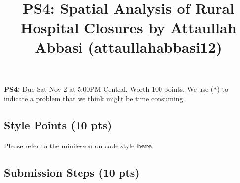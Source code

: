 \documentclass[
  letterpaper,
  DIV=11,
  numbers=noendperiod]{scrartcl}
\title{PS4: Spatial Analysis of Rural Hospital Closures by Attaullah
Abbasi (attaullahabbasi12)}
\author{}
\date{}
\begin{document}
\maketitle



\textbf{PS4:} Due Sat Nov 2 at 5:00PM Central. Worth 100 points. We use
(\texttt{*}) to indicate a problem that we think might be time
consuming.

\subsection{Style Points (10 pts)}\label{style-points-10-pts}

Please refer to the minilesson on code style
\textbf{\href{https://uchicago.zoom.us/rec/share/pG_wQ-pHTQrJTmqNn4rcrw5V194M2H2s-2jdy8oVhWHkd_yZt9o162IWurpA-fxU.BIQlSgZLRYctvzp-}{here}}.

\subsection{Submission Steps (10 pts)}\label{submission-steps-10-pts}
\end{document}
